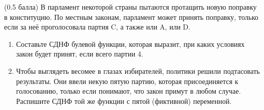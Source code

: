 \question
(0.5 балла) В парламент некоторой страны пытаются протащить новую поправку в конституцию. По местным законам, парламент может принять поправку, только если за неё проголосовала партия C, а также или A, или D.

\begin{enumerate}
    \item Составьте СДНФ булевой функции, которая выразит, при каких условиях закон будет принят, если всего партии 4.
    \item Чтобы выглядеть весомее в глазах избирателей, политики решили подтасовать результаты.  Они ввели некую пятую партию, которая присоединяется к голосованию, только если понимают, что закон примут в любом случае. Распишите СДНФ той же функции с пятой (фиктивной) переменной.
\end{enumerate}